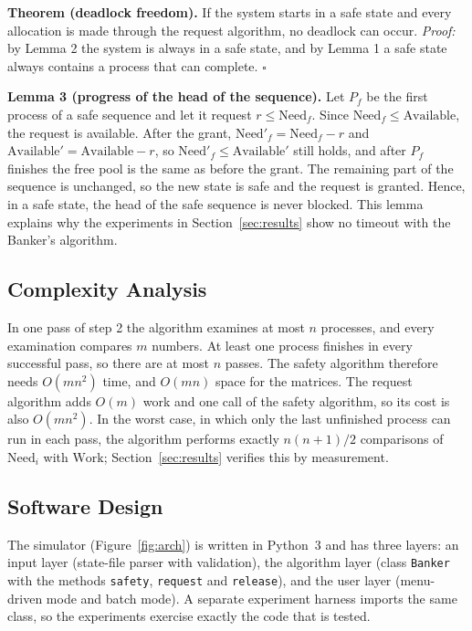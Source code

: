 \documentclass[11pt,a4paper]{report}
\begin{document}
\textbf{Theorem (deadlock freedom).} If the system starts in a safe state and every allocation is made through the request algorithm, no deadlock can occur. \emph{Proof:} by Lemma 2 the system is always in a safe state, and by Lemma 1 a safe state always contains a process that can complete. $\square$

\textbf{Lemma 3 (progress of the head of the sequence).} Let $P_f$ be the first process of a safe sequence and let it request $r\le\text{Need}_f$. Since $\text{Need}_f\le\text{Available}$, the request is available. After the grant, $\text{Need}'_f=\text{Need}_f-r$ and $\text{Available}'=\text{Available}-r$, so $\text{Need}'_f\le\text{Available}'$ still holds, and after $P_f$ finishes the free pool is the same as before the grant. The remaining part of the sequence is unchanged, so the new state is safe and the request is granted. Hence, in a safe state, the head of the safe sequence is never blocked. This lemma explains why the experiments in Section~\ref{sec:results} show no timeout with the Banker's algorithm.

\subsection{Complexity Analysis}
In one pass of step 2 the algorithm examines at most $n$ processes, and every examination compares $m$ numbers. At least one process finishes in every successful pass, so there are at most $n$ passes. The safety algorithm therefore needs $O(mn^2)$ time, and $O(mn)$ space for the matrices. The request algorithm adds $O(m)$ work and one call of the safety algorithm, so its cost is also $O(mn^2)$. In the worst case, in which only the last unfinished process can run in each pass, the algorithm performs exactly $n(n+1)/2$ comparisons of $\text{Need}_i$ with $\text{Work}$; Section~\ref{sec:results} verifies this by measurement.

\subsection{Software Design}
The simulator (Figure~\ref{fig:arch}) is written in Python~3 and has three layers: an input layer (state-file parser with validation), the algorithm layer (class \texttt{Banker} with the methods \texttt{safety}, \texttt{request} and \texttt{release}), and the user layer (menu-driven mode and batch mode). A separate experiment harness imports the same class, so the experiments exercise exactly the code that is tested.
\end{document}
